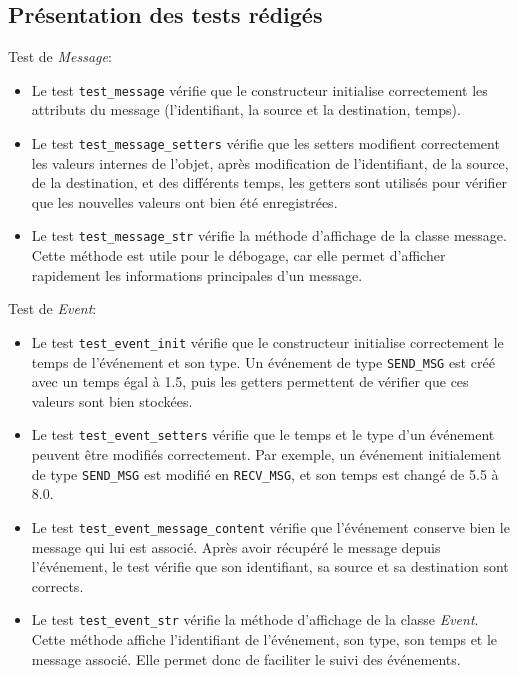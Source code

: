 \documentclass[11pt,a4paper]{article}
\begin{document}
\bigskip
\bigskip

\subsection{Présentation des tests rédigés}

Test de \emph{Message}:
\begin{itemize}
    \item Le test \lstinline|test_message| vérifie que le constructeur initialise correctement les attributs du message (l'identifiant, la source et la destination, temps).
    \item Le test \lstinline|test_message_setters| vérifie que les setters modifient correctement les valeurs internes de l'objet, après modification de l'identifiant, de la source, de la destination, et des différents temps, les getters sont utilisés pour vérifier que les nouvelles valeurs ont bien été enregistrées.
    \item Le test \lstinline|test_message_str| vérifie la méthode d'affichage de la classe message. Cette méthode est utile pour le débogage, car elle permet d'afficher rapidement les informations principales d'un message.
\end{itemize}

\bigskip

Test de \emph{Event}:
\begin{itemize}
    \item Le test \lstinline|test_event_init| vérifie que le constructeur initialise correctement le temps de l'événement et son type. Un événement de type \lstinline|SEND_MSG| est créé avec un temps égal à 1.5, puis les getters permettent de vérifier que ces valeurs sont bien stockées.
    \item Le test \lstinline|test_event_setters| vérifie que le temps et le type d'un événement peuvent être modifiés correctement. Par exemple, un événement initialement de type \lstinline|SEND_MSG| est modifié en \lstinline|RECV_MSG|, et son temps est changé de 5.5 à 8.0.
    \item Le test \lstinline|test_event_message_content| vérifie que l'événement conserve bien le message qui lui est associé. Après avoir récupéré le message depuis l'événement, le test vérifie que son identifiant, sa source et sa destination sont corrects.
    \item Le test \lstinline|test_event_str| vérifie la méthode d'affichage de la classe \emph{Event}. Cette méthode affiche l'identifiant de l'événement, son type, son temps et le message associé. Elle permet donc de faciliter le suivi des événements.
\end{itemize}
\end{document}
